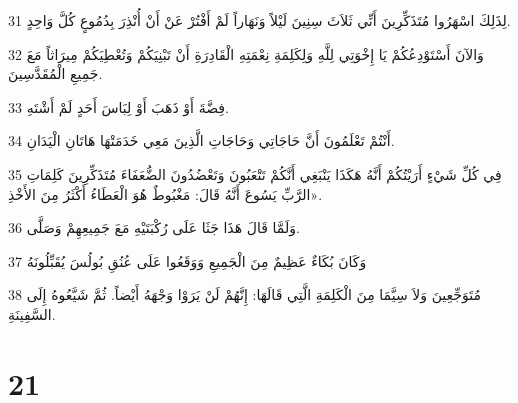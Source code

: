 \par 31 لِذَلِكَ اسْهَرُوا مُتَذَكِّرِينَ أَنِّي ثَلاَثَ سِنِينَ لَيْلاً وَنَهَاراً لَمْ أَفْتُرْ عَنْ أَنْ أُنْذِرَ بِدُمُوعٍ كُلَّ وَاحِدٍ.
\par 32 وَالآنَ أَسْتَوْدِعُكُمْ يَا إِخْوَتِي لِلَّهِ وَلِكَلِمَةِ نِعْمَتِهِ الْقَادِرَةِ أَنْ تَبْنِيَكُمْ وَتُعْطِيَكُمْ مِيرَاثاً مَعَ جَمِيعِ الْمُقَدَّسِينَ.
\par 33 فِضَّةَ أَوْ ذَهَبَ أَوْ لِبَاسَ أَحَدٍ لَمْ أَشْتَهِ.
\par 34 أَنْتُمْ تَعْلَمُونَ أَنَّ حَاجَاتِي وَحَاجَاتِ الَّذِينَ مَعِي خَدَمَتْهَا هَاتَانِ الْيَدَانِ.
\par 35 فِي كُلِّ شَيْءٍ أَرَيْتُكُمْ أَنَّهُ هَكَذَا يَنْبَغِي أَنَّكُمْ تَتْعَبُونَ وَتَعْضُدُونَ الضُّعَفَاءَ مُتَذَكِّرِينَ كَلِمَاتِ الرَّبِّ يَسُوعَ أَنَّهُ قَالَ: مَغْبُوطٌ هُوَ الْعَطَاءُ أَكْثَرُ مِنَ الأَخْذِ».
\par 36 وَلَمَّا قَالَ هَذَا جَثَا عَلَى رُكْبَتَيْهِ مَعَ جَمِيعِهِمْ وَصَلَّى.
\par 37 وَكَانَ بُكَاءٌ عَظِيمٌ مِنَ الْجَمِيعِ وَوَقَعُوا عَلَى عُنُقِ بُولُسَ يُقَبِّلُونَهُ
\par 38 مُتَوَجِّعِينَ وَلاَ سِيَّمَا مِنَ الْكَلِمَةِ الَّتِي قَالَهَا: إِنَّهُمْ لَنْ يَرَوْا وَجْهَهُ أَيْضاً. ثُمَّ شَيَّعُوهُ إِلَى السَّفِينَةِ.

\chapter{21}

